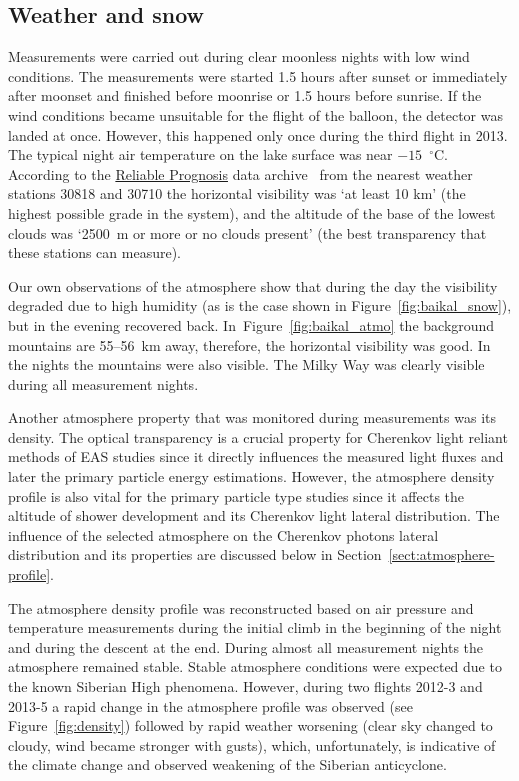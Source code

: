 \documentclass[universe,article,submit,moreauthors,pdftex]{Definitions/mdpi}
\begin{document}
\subsection{Weather and snow}

Measurements were carried out during clear moonless nights with low wind conditions. The measurements were started 1.5 hours after sunset or immediately after moonset and finished before moonrise or 1.5 hours before sunrise. If the wind conditions became unsuitable for the flight of the balloon, the detector was landed at once. However, this happened only once during the third flight in 2013. The typical night air temperature on the lake surface was near $-15$~$^\circ$C. According to the \href{https://rp5.ru/Weather_in_the_world}{Reliable Prognosis} data archive~\cite{rp5} from the nearest weather stations 30818 and 30710 the horizontal visibility was `at least 10 km' (the highest possible grade in the system), and the altitude of the base of the lowest clouds was `2500~m or more or no clouds present' (the best transparency that these stations can measure).

Our own observations of the atmosphere show that during the day the visibility degraded due to high humidity (as is the case shown in Figure~\ref{fig:baikal_snow}), but in the evening recovered back. In~Figure~\ref{fig:baikal_atmo} the background mountains are 55--56~km away, therefore, the horizontal visibility was good. In the nights the mountains were also visible. The Milky Way was clearly visible during all measurement nights. 

Another atmosphere property that was monitored during measurements was its density. The optical transparency is a crucial property for Cherenkov light reliant methods of EAS studies since it directly influences the measured light fluxes and later the primary particle energy estimations. However, the atmosphere density profile is also vital for the primary particle type studies since it affects the altitude of shower development and its Cherenkov light lateral distribution. The influence of the selected atmosphere on the Cherenkov photons lateral distribution and its properties are discussed below in Section~\ref{sect:atmosphere-profile}.

The atmosphere density profile was reconstructed based on air pressure and temperature measurements during the initial climb in the beginning of the night and during the descent at the end. During almost all measurement nights the atmosphere remained stable. Stable atmosphere conditions were expected due to the known Siberian High phenomena. However, during two flights 2012-3 and 2013-5 a rapid change in the atmosphere profile was observed (see Figure~\ref{fig:density}) followed by rapid weather worsening (clear sky changed to cloudy, wind became stronger with gusts), which, unfortunately, is indicative of the climate change and observed weakening of the Siberian anticyclone. 
\end{document}

